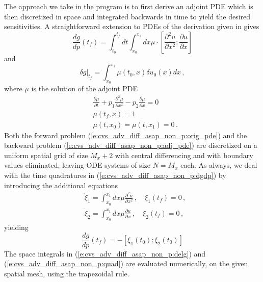 The approach we take in the program  is to first derive an 
adjoint PDE which is then discretized in space and integrated backwards
in time to yield the desired sensitivities. A straightforward extension 
to PDEs of the derivation given in  gives
\begin{equation}\label{e:cvs_adv_diff_asap_non_p:dgdp}
  \frac{dg}{dp} (t_f) = \int_{t_0}^{t_f} dt 
  \int_{x_0}^{x_1} dx \mu \cdot 
  \left[
    \frac{\partial^2 u}{\partial x^2} ;
    \frac{\partial u}{\partial x}
  \right ]
\end{equation}
and
\begin{equation}\label{e:cvs_adv_diff_asap_non_p:delg}
  \delta g |_{t_f} = \int_{x_0}^{x_1} \mu(t_0,x) \delta u_0(x) dx \, , 
\end{equation}
where $\mu$ is the solution of the adjoint PDE
\begin{equation}\label{e:cvs_adv_diff_asap_non_p:adj_pde}
  \begin{split}
    & \frac{\partial \mu}{\partial t} + p_1 \frac{\partial^2 \mu}{\partial x^2} 
    - p_2 \frac{\partial \mu}{\partial x} = 0 \\
    & \mu(t_f , x) = 1 \\
    & \mu(t , x_0) = \mu( t , x_1 ) = 0 \, .
  \end{split}
\end{equation}
Both the forward problem (\ref{e:cvs_adv_diff_asap_non_p:orig_pde}) and the backward
problem (\ref{e:cvs_adv_diff_asap_non_p:adj_pde}) are discretized on a uniform spatial
grid of size $M_x + 2$ with central differencing and with boundary values eliminated,
leaving ODE systems of size $N = M_x$ each.  As always, we deal with the time
quadratures in (\ref{e:cvs_adv_diff_asap_non_p:dgdp}) by introducing the additional
equations
\begin{equation}\label{e:cvs_adv_diff_asap_non_p:quad}
  \begin{split}
    &{\dot\xi}_1 = \int_{x_0}^{x_1} dx \mu \frac{\partial^2 u}{\partial x^2} \, , \quad
    \xi_1(t_f) = 0 \, , \\
    &{\dot\xi}_2 = \int_{x_0}^{x_1} dx \mu \frac{\partial u}{\partial x} \, , \quad
    \xi_2(t_f) = 0 \, ,
  \end{split}
\end{equation}
yielding
\begin{equation*}
  \frac{dg}{dp} (t_f) = - \left[ \xi_1(t_0) ; \xi_2(t_0) \right ]
\end{equation*}
The space integrals in (\ref{e:cvs_adv_diff_asap_non_p:delg}) and
(\ref{e:cvs_adv_diff_asap_non_p:quad}) are
evaluated numerically, on the given spatial mesh, using the trapezoidal rule.

